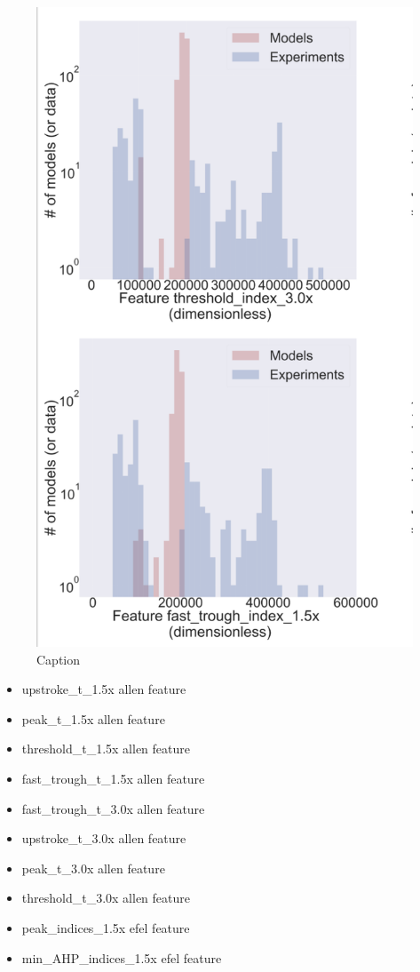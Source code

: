 \begin{figure}
    \centering
    \includegraphics{figures/features_that_disagree}
    \caption{Caption}
    \label{fig:from_poster_disagree}
\end{figure}




\begin{itemize}
    \item upstroke\_t\_1.5x allen feature
    \item  peak\_t\_1.5x allen feature
    \item threshold\_t\_1.5x allen feature
    \item fast\_trough\_t\_1.5x allen feature
    \item fast\_trough\_t\_3.0x allen feature
    \item upstroke\_t\_3.0x allen feature
    \item peak\_t\_3.0x allen feature
    \item threshold\_t\_3.0x allen feature
    \item peak\_indices\_1.5x efel feature
    \item min\_AHP\_indices\_1.5x efel feature
\end{itemize}


